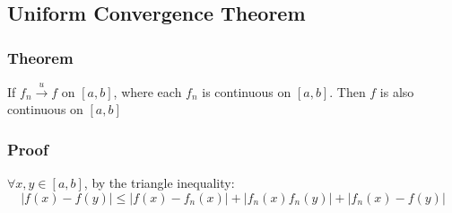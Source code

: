 \documentclass[11 pt, twoside]{article}
\begin{document}
\subsection{Uniform Convergence Theorem}
\subsubsection{Theorem}
If $f_n \overset{u}{\to} f$ on $[a, b]$, where each $f_n$ is continuous on
$[a,b]$. Then $f$ is also continuous on $[a,b]$

\subsubsection{Proof}
$\forall x, y \in [a,b]$, by the triangle inequality:
$$|f(x) - f(y)| \leq |f(x) - f_n(x)| + |f_n(x) f_n(y)| + |f_n(x) - f(y)|$$
\end{document}
